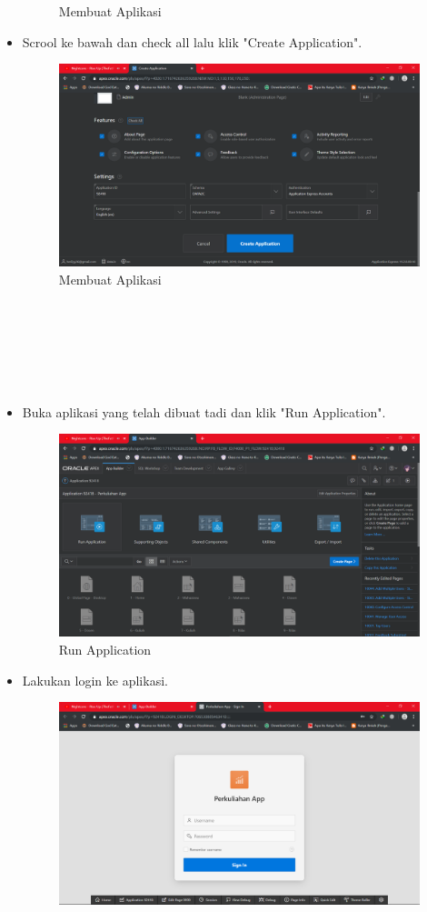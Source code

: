 \documentclass[12pt, times new roman]{article}
\begin{document}
\begin{itemize}
\begin{figure}[htbp]
	\caption{Membuat Aplikasi}
\end{figure}
\item Scrool ke bawah dan check all lalu klik "Create Application".
\begin{figure}[htbp]
	\centering
	\includegraphics[width=10.5cm]{figures/Screenshot_18.png}
	\caption{Membuat Aplikasi}
\end{figure}\\
\\
\\
\\
\\
\item Buka aplikasi yang telah dibuat tadi dan klik "Run Application".
\begin{figure}[htbp]
	\centering
	\includegraphics[width=10.5cm]{figures/Screenshot_19.png}
	\caption{Run Application}
\end{figure}
\item Lakukan login ke aplikasi.
\begin{figure}[htbp]
	\centering
	\includegraphics[width=10.5cm]{figures/Screenshot_20.png}

\end{figure}
\end{itemize}
\end{document}
